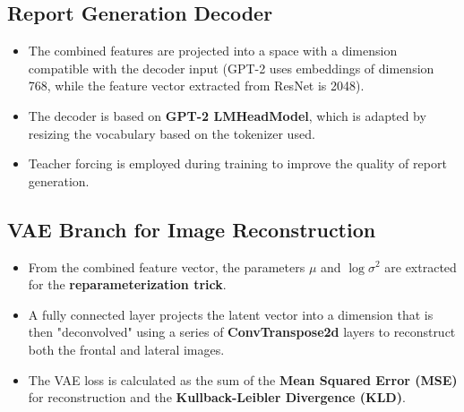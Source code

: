 \documentclass[a4paper,12pt]{article}
\begin{document}
\subsection{Report Generation Decoder}
\begin{itemize}
    \item The combined features are projected into a space with a dimension compatible with the decoder input (GPT-2 uses embeddings of dimension 768, while the feature vector extracted from ResNet is 2048).
    \item The decoder is based on \textbf{GPT-2 LMHeadModel}, which is adapted by resizing the vocabulary based on the tokenizer used.
    \item Teacher forcing is employed during training to improve the quality of report generation.
\end{itemize}

\subsection{VAE Branch for Image Reconstruction}
\begin{itemize}
    \item From the combined feature vector, the parameters $\mu$ and $\log\sigma^2$ are extracted for the \textbf{reparameterization trick}.
    \item A fully connected layer projects the latent vector into a dimension that is then "deconvolved" using a series of \textbf{ConvTranspose2d} layers to reconstruct both the frontal and lateral images.
    \item The VAE loss is calculated as the sum of the \textbf{Mean Squared Error (MSE)} for reconstruction and the \textbf{Kullback-Leibler Divergence (KLD)}.
\end{itemize}
\end{document}
